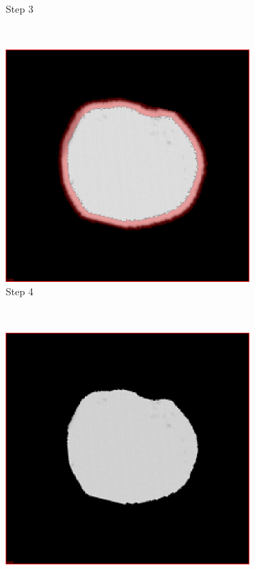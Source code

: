 \begin{figure}[h]
\begin{subfigure}[b]{0.3\textwidth}
    \caption{Step 3}
    \label{fig:erosion3}
  \end{subfigure}%
  ~ %
  \begin{subfigure}[b]{0.3\textwidth}
    \includegraphics[width=\textwidth]{images/erosion_4.png}
    \caption{Step 4}
    \label{fig:erosion4}
  \end{subfigure}  
  ~ %
  \begin{subfigure}[b]{0.3\textwidth}
    \includegraphics[width=\textwidth]{images/erosion_5.png}

\end{subfigure}
\end{figure}
